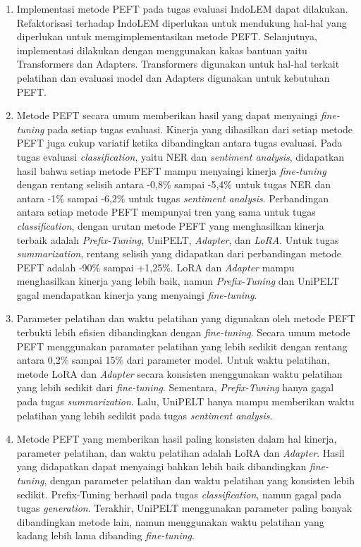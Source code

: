 \begin{enumerate}
    \item{
        Implementasi metode PEFT pada tugas evaluasi IndoLEM dapat dilakukan. Refaktorisasi terhadap IndoLEM diperlukan untuk mendukung hal-hal yang diperlukan untuk memgimplementasikan metode PEFT. Selanjutnya, implementasi dilakukan dengan menggunakan kakas bantuan yaitu Transformers dan Adapters. Transformers digunakan untuk hal-hal terkait pelatihan dan evaluasi model dan Adapters digunakan untuk kebutuhan PEFT.
    }
    \item {
            Metode PEFT secara umum memberikan hasil yang dapat menyaingi \textit{fine-tuning} pada setiap tugas evaluasi. Kinerja yang dihasilkan dari setiap metode PEFT juga cukup variatif ketika dibandingkan antara tugas evaluasi. Pada tugas evaluasi \textit{classification}, yaitu NER dan \textit{sentiment analysis}, didapatkan hasil bahwa setiap metode PEFT mampu menyaingi kinerja \textit{fine-tuning} dengan rentang selisih antara -0,8\% sampai -5,4\% untuk tugas NER dan antara -1\% sampai -6,2\% untuk tugas \textit{sentiment analysis}. Perbandingan antara setiap metode PEFT mempunyai tren yang sama untuk tugas \textit{classification}, dengan urutan metode PEFT yang menghasilkan kinerja terbaik adalah \textit{Prefix-Tuning}, UniPELT, \textit{Adapter}, dan \textit{LoRA}. Untuk tugas \textit{summarization}, rentang selisih yang didapatkan dari perbandingan metode PEFT adalah -90\% sampai +1,25\%. LoRA dan \textit{Adapter} mampu menghasilkan kinerja yang lebih baik, namun \textit{Prefix-Tuning} dan UniPELT gagal mendapatkan kinerja yang menyaingi \textit{fine-tuning}.
    }
    \item {
            Parameter pelatihan dan waktu pelatihan yang digunakan oleh metode PEFT terbukti lebih efisien dibandingkan dengan \textit{fine-tuning}. Secara umum metode PEFT menggunakan paramater pelatihan yang lebih sedikit dengan rentang antara 0,2\% sampai 15\% dari parameter model. Untuk waktu pelatihan, metode LoRA dan \textit{Adapter} secara konsisten menggunakan waktu pelatihan yang lebih sedikit dari \textit{fine-tuning}. Sementara, \textit{Prefix-Tuning} hanya gagal pada tugas \textit{summarization}. Lalu, UniPELT hanya mampu memberikan waktu pelatihan yang lebih sedikit pada tugas \textit{sentiment analysis}.
    }
    \item {
            Metode PEFT yang memberikan hasil paling konsisten dalam hal kinerja, parameter pelatihan, dan waktu pelatihan adalah LoRA dan \textit{Adapter}. Hasil yang didapatkan dapat menyaingi bahkan lebih baik dibandingkan \textit{fine-tuning}, dengan parameter pelatihan dan waktu pelatihan yang konsisten lebih sedikit. Prefix-Tuning berhasil pada tugas \textit{classification}, namun gagal pada tugas \textit{generation}. Terakhir, UniPELT menggunakan parameter paling banyak dibandingkan metode lain, namun menggunakan waktu pelatihan yang kadang lebih lama dibanding \textit{fine-tuning}.
    }
\end{enumerate}

